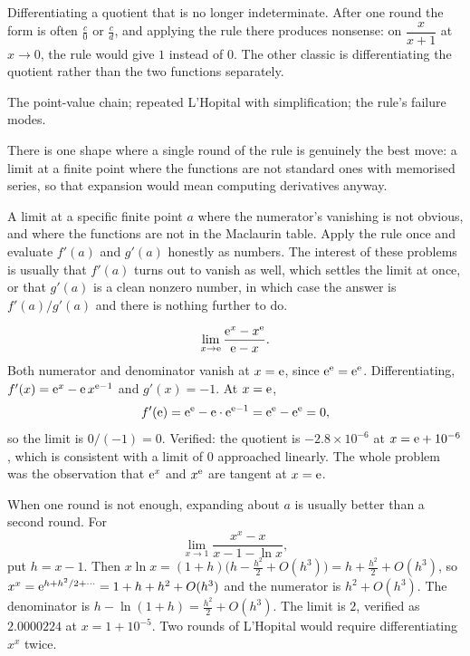 \begin{trap}
Differentiating a quotient that is no longer indeterminate. After one round the form is often $\tfrac{c}{0}$ or $\tfrac{c}{d}$, and applying the rule there produces nonsense: on $\dfrac{x}{x+1}$ at $x\to0$, the rule would give $1$ instead of $0$. The other classic is differentiating the quotient rather than the two functions separately.
\end{trap}

\begin{seealsob}The point-value chain; repeated L'Hopital with simplification; the rule's failure modes.\end{seealsob}

There is one shape where a single round of the rule is genuinely the best move: a limit at a finite point where the functions are not standard ones with memorised series, so that expansion would mean computing derivatives anyway.

\cue A limit at a specific finite point $a$ where the numerator's vanishing is not obvious, and where the functions are not in the Maclaurin table.
\method Apply the rule once and evaluate $f'(a)$ and $g'(a)$ honestly as numbers. The interest of these problems is usually that $f'(a)$ turns out to vanish as well, which settles the limit at once, or that $g'(a)$ is a clean nonzero number, in which case the answer is $f'(a)/g'(a)$ and there is nothing further to do.

\begin{worked}
\[
\lim_{x\to\mathrm{e}}\frac{\mathrm{e}^{x}-x^{\mathrm{e}}}{\mathrm{e}-x}.
\]
Both numerator and denominator vanish at $x=\mathrm{e}$, since $\mathrm{e}^{\mathrm{e}}=\mathrm{e}^{\mathrm{e}}$. Differentiating, $f'(x)=\mathrm{e}^{x}-\mathrm{e}\,x^{\mathrm{e}-1}$ and $g'(x)=-1$. At $x=\mathrm{e}$,
\[
f'(\mathrm{e})=\mathrm{e}^{\mathrm{e}}-\mathrm{e}\cdot\mathrm{e}^{\mathrm{e}-1}=\mathrm{e}^{\mathrm{e}}-\mathrm{e}^{\mathrm{e}}=0,
\]
so the limit is $0/(-1)=0$. Verified: the quotient is $-2.8\times10^{-6}$ at $x=\mathrm{e}+10^{-6}$, which is consistent with a limit of $0$ approached linearly. The whole problem was the observation that $\mathrm{e}^{x}$ and $x^{\mathrm{e}}$ are tangent at $x=\mathrm{e}$.

When one round is not enough, expanding about $a$ is usually better than a second round. For
\[
\lim_{x\to1}\frac{x^{x}-x}{x-1-\ln x},
\]
put $h=x-1$. Then $x\ln x=(1+h)\bigl(h-\tfrac{h^{2}}{2}+O(h^{3})\bigr)=h+\tfrac{h^{2}}{2}+O(h^{3})$, so $x^{x}=\mathrm{e}^{h+h^{2}/2+\cdots}=1+h+h^{2}+O(h^{3})$ and the numerator is $h^{2}+O(h^{3})$. The denominator is $h-\ln(1+h)=\tfrac{h^{2}}{2}+O(h^{3})$. The limit is $2$, verified as $2.0000224$ at $x=1+10^{-5}$. Two rounds of L'Hopital would require differentiating $x^{x}$ twice.
\end{worked}

